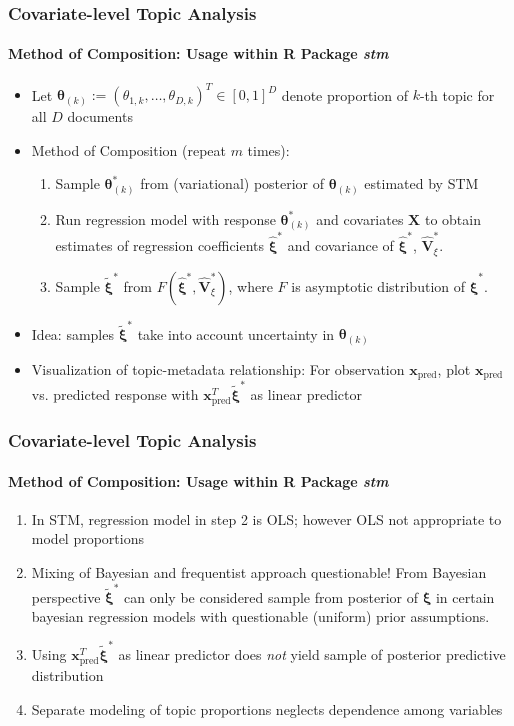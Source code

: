 \documentclass[xcolor=dvipsnames]{beamer}
\begin{document}
\begin{frame}
\frametitle{Covariate-level Topic Analysis}
\framesubtitle{Method of Composition: Usage within R Package \textit{stm}}
\begin{itemize}
\item Let $\boldsymbol{\theta}_{(k)}:=(\theta_{1,k}, \dots, \theta_{D,k})^T \in [0,1]^{D}$ denote proportion of $k$-th topic for all $D$ documents
\item Method of Composition (repeat $m$ times):
\begin{enumerate}
\item Sample $\boldsymbol{\theta}^*_{(k)}$ from (variational) posterior of $\boldsymbol{\theta}_{(k)}$ estimated by STM
\item Run regression model with response $\boldsymbol{\theta}^*_{(k)}$ and covariates $\boldsymbol{X}$ to obtain estimates of regression coefficients $\hat{\boldsymbol{\xi}}^*$ and covariance of $\hat{\boldsymbol{\xi}}^*$, $\hat{\boldsymbol{V}}^*_{\xi}$.
\item Sample $\tilde{\boldsymbol{\xi}}^*$ from $F(\hat{\boldsymbol{\xi}}^*, \hat{\boldsymbol{V}}^*_{\xi})$, where $F$ is asymptotic distribution of $\hat{\boldsymbol{\xi}}^*$.
\end{enumerate}
\item Idea: samples $\tilde{\boldsymbol{\xi}}^*$ take into account uncertainty in $\boldsymbol{\theta}_{(k)}$
\item Visualization of topic-metadata relationship: For observation $\boldsymbol{x}_{\text{pred}}$, plot $\boldsymbol{x}_{\text{pred}}$ vs. predicted response with $\boldsymbol{x}_{\text{pred}}^T \tilde{\boldsymbol{\xi}}^*$ as linear predictor
\end{itemize}
\end{frame}

\begin{frame}
\frametitle{Covariate-level Topic Analysis}
\framesubtitle{Method of Composition: Usage within R Package \textit{stm}}
\begin{enumerate}
\item In STM, regression model in step 2 is OLS; however OLS not appropriate to model proportions
\item Mixing of Bayesian and frequentist approach questionable! From Bayesian perspective $\tilde{\boldsymbol{\xi}}^*$ can only be considered sample from posterior of $\boldsymbol{\xi}$ in certain bayesian regression models with questionable (uniform) prior assumptions.
\item Using $\boldsymbol{x}_{\text{pred}}^T \tilde{\boldsymbol{\xi}}^*$  as linear predictor does \textit{not} yield sample of posterior predictive distribution
\item Separate modeling of topic proportions neglects dependence among variables
\end{enumerate}
\end{frame}
\end{document}
